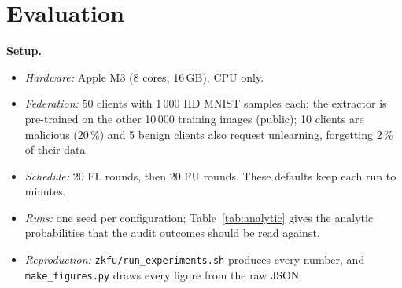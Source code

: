 \documentclass[conference]{IEEEtran}
\newcommand{\code}[1]{\texttt{\small #1}}
\begin{document}
\section{Evaluation}\label{sec:eval}
\textbf{Setup.}
\begin{itemize}
\item \emph{Hardware:} Apple M3 (8 cores, 16\,GB), CPU only.
\item \emph{Federation:} 50 clients with 1\,000 IID MNIST samples each; the extractor is
pre-trained on the other 10\,000 training images (public); 10 clients are malicious (20\,\%) and 5
benign clients also request unlearning, forgetting 2\,\% of their data.
\item \emph{Schedule:} 20 FL rounds, then 20 FU rounds. These defaults keep each run to minutes.
\item \emph{Runs:} one seed per configuration; Table~\ref{tab:analytic} gives the analytic
probabilities that the audit outcomes should be read against.
\item \emph{Reproduction:} \code{zkfu/run\_experiments.sh} produces every number, and
\code{make\_figures.py} draws every figure from the raw JSON.
\end{itemize}
\end{document}

